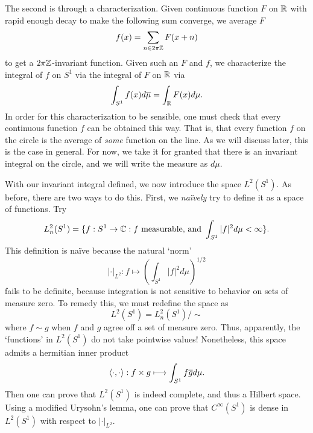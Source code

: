 \documentclass[12pt]{amsart}
\begin{document}
 The second is through a characterization. Given continuous function $F$ on $\mathbb{R}$ with rapid enough decay to make the following sum converge, we average $F$
 	\begin{equation*}
		f(x)=\sum_{n\in 2\pi \mathbb{Z} } F(x+n)
	\end{equation*}
to get a $2\pi \mathbb{Z}$-invariant function. Given such an $F$ and $f$, we characterize the integral of $f$ on $S^1$ via the integral of $F$ on $\mathbb{R}$ via
	\begin{equation*}
		 \int_{S^1} f(x)d\overline{\mu} = \int_{\mathbb{R}} F(x) d\mu.
	\end{equation*}
In order for this characterization to be sensible, one must check that every continuous function $f$ can be obtained this way. That is, that every function $f$ on the circle is the average of \emph{some} function on the line. As we will discuss later, this is the case in general. For now, we take it for granted that there is an invariant integral on the circle, and we will write the measure as $d\mu$.

With our invariant integral defined, we now introduce the space $L^2(S^1)$. As before, there are two ways to do this. First, we \emph{na\"ively} try to define it as a space of functions. Try
	\begin{equation*}
		L^2_n(S^1)=\{f:S^1\to \mathbb{C}: f\text{ measurable, and } \int_{S^1}|f|^2d\mu < \infty\}.
	\end{equation*}
This definition is na\"ive because the natural `norm' 
	\begin{equation*}
		|\cdot|_{L^2}: f\mapsto \left(\int_{S^1} |f|^2 d\mu \right)^{1/2}
	\end{equation*}
fails to be definite, because integration is not sensitive to behavior on sets of measure zero. To remedy this, we must redefine the space as
	\begin{equation*}
		L^2(S^1)=L^2_n(S^1)/\sim
	\end{equation*}
where $f\sim g$ when $f$ and $g$ agree off a set of measure zero. Thus, apparently, the `functions' in $L^2(S^1)$ do not take pointwise values!  Nonetheless, this space admits a hermitian inner product
	\begin{equation*}
		\langle \cdot, \cdot \rangle: f\times g \longmapsto \int_{S^1} f \overline{g} d\mu.
	\end{equation*}
Then one can prove that $L^2(S^1)$ is indeed complete, and thus a Hilbert space. Using a modified Urysohn's lemma, one can prove that $C^\infty(S^1)$ is dense in $L^2(S^1)$ with respect to $|\cdot|_{L^2}$.
\end{document}
